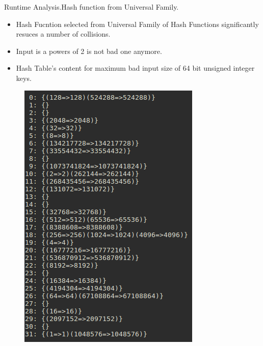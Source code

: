 \documentclass{beamer}
\begin{document}
\begin{frame}{Runtime Analysis.}{Hash function from Universal Family.}
  \begin{itemize}
  \item Hash Fucntion selected from Universal Family of Hash Functions significantly resuces a number of collisions.
  \item Input is a powers of 2 is not bad one anymore.
  \item Hash Table's content for maximum bad input size of 64 bit unsigned integer keys. 
  \end{itemize}
  \begin{figure}
    \includegraphics[scale=0.3]{pictures/uint64_t_universal}
  \end{figure}
\end{frame}
\end{document}
